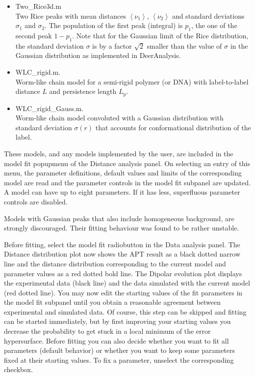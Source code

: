 \documentclass{article}
\begin{document}
\begin{itemize}
	\item {\ttfamily Two\_Rice3d.m} \\ Two Rice peaks \cite{koehler2011} with mean distances $\left\langle\nu_1\right\rangle$, $\left\langle\nu_2\right\rangle$ and standard deviations $\sigma_1$ and $\sigma_2$. The population of the first peak (integral) is $p_1$, the one of the second peak $1-p_1$. Note that for the Gaussian limit of the Rice distribution, the standard deviation $\sigma$ is by a factor $\sqrt{2}$ smaller than the value of $\sigma$ in the Gaussian distribution as implemented in DeerAnalysis.	
	\item {\ttfamily WLC\_rigid.m}. \\ Worm-like chain model \cite{godt2006} for a semi-rigid polymer (or DNA) with label-to-label distance $L$ and persistence length $L_\mathrm{p}$.
	\item {\ttfamily WLC\_rigid\_Gauss.m}. \\ Worm-like chain model convoluted with a Gaussian distribution with standard deviation $\sigma(r)$ that accounts for conformational distribution of the label. 
  
\end{itemize}
These models, and any models implemented by the user, are included in the {\ttfamily model fit} popupmenu of the {\ttfamily Distance analysis} panel. On selecting an entry of this menu, the parameter definitions, default values and limits of the corresponding model are read and the parameter controls in the {\ttfamily model fit} subpanel are updated. A model can have up to eight parameters. If it has less, superfluous parameter controls are disabled.

Models with Gaussian peaks that also include homogeneous background, are strongly discouraged. Their fitting behaviour was found to be rather unstable.

Before fitting, select the {\ttfamily model fit} radiobutton in the {\ttfamily Data analysis} panel. The {\ttfamily Distance distribution} plot now shows the APT result as a black dotted narrow line and the distance distribution corresponding to the current model and parameter values as a red dotted bold line. The {\ttfamily Dipolar evolution} plot displays the experimental data (black line) and the data simulated with the current model (red dotted line). You may now edit the starting values of the fit parameters in the {\ttfamily model fit} subpanel until you obtain a reasonable agreement between experimental and simulated data. Of course, this step can be skipped and fitting can be started immediately, but by first improving your starting values you decrease the probability to get stuck in a local minimum of the error hypersurface. Before fitting you can also decide whether you want to fit all parameters (default behavior) or whether you want to keep some parameters fixed at their starting values. To fix a parameter, unselect the corresponding checkbox.
\end{document}
